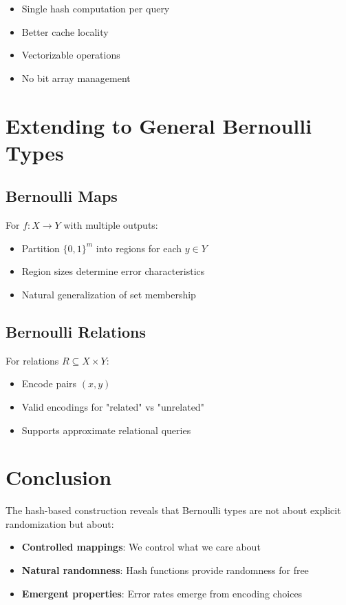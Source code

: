 \documentclass[11pt,final,hidelinks]{article}
\begin{document}
\begin{itemize}
    \item Single hash computation per query
    \item Better cache locality
    \item Vectorizable operations
    \item No bit array management
\end{itemize}

\section{Extending to General Bernoulli Types}

\subsection{Bernoulli Maps}

For $f: X \to Y$ with multiple outputs:
\begin{itemize}
    \item Partition $\{0,1\}^m$ into regions for each $y \in Y$
    \item Region sizes determine error characteristics
    \item Natural generalization of set membership
\end{itemize}

\subsection{Bernoulli Relations}

For relations $R \subseteq X \times Y$:
\begin{itemize}
    \item Encode pairs $(x,y)$
    \item Valid encodings for "related" vs "unrelated"
    \item Supports approximate relational queries
\end{itemize}

\section{Conclusion}

The hash-based construction reveals that Bernoulli types are not about explicit randomization but about:
\begin{itemize}
    \item \textbf{Controlled mappings}: We control what we care about
    \item \textbf{Natural randomness}: Hash functions provide randomness for free
    \item \textbf{Emergent properties}: Error rates emerge from encoding choices
\end{itemize}
\end{document}
